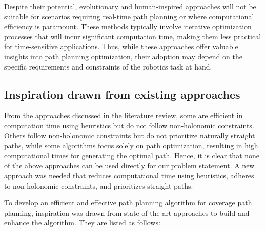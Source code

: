 \vspace*{6mm}


Despite their potential, evolutionary and human-inspired approaches will not be suitable for scenarios requiring real-time path planning or where computational efficiency is paramount. These methods typically involve iterative optimization processes that will incur significant computation time, making them less practical for time-sensitive applications. Thus, while these approaches offer valuable insights into path planning optimization, their adoption may depend on the specific requirements and constraints of the robotics task at hand.


\subsection{Inspiration drawn from existing approaches}

From the approaches discussed in the literature review, some are efficient in computation time using heuristics but do not follow non-holonomic constraints. Others follow non-holonomic constraints but do not prioritize naturally straight paths, while some algorithms focus solely on path optimization, resulting in high computational times for generating the optimal path. Hence, it is clear that none of the above approaches can be used directly for our problem statement. A new approach was needed that reduces computational time using heuristics, adheres to non-holonomic constraints, and prioritizes straight paths.

\vspace*{6mm}

To develop an efficient and effective path planning algorithm for coverage path planning, inspiration was drawn from state-of-the-art approaches to build and enhance the algorithm. They are listed as follows:


